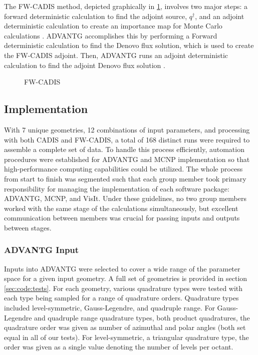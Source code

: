 \documentclass[10pt]{article}
\begin{document}
The FW-CADIS method, depicted graphically in \cref{flow:fw-cadis}, involves two major steps: a forward deterministic calculation to find the adjoint source, $q^\dagger$, and an adjoint deterministic calculation to create an importance map for Monte Carlo calculations \cite{slaybaugh:deterministic-parameter-study}.
ADVANTG accomplishes this by performing a Forward deterministic calculation to find the Denovo flux solution, which is used to create the FW-CADIS adjoint.
Then, ADVANTG runs an adjoint deterministic calculation to find the adjoint Denovo flux solution \cite{software:advantg}.


\begin{figure}[!t]

\caption{FW-CADIS}
\label{flow:fw-cadis}
\end{figure}

\subsection{Implementation}

With 7 unique geometries, 12 combinations of input parameters, and processing with both CADIS and FW-CADIS, a total of 168 distinct runs were required to assemble a complete set of data. To handle this process efficiently, automation procedures were established for ADVANTG and MCNP implementation so that high-performance computing capabilities could be utilized. 
The whole process from start to finish was segmented such that each group member took primary responsibility for managing the implementation of each software package: ADVANTG, MCNP, and VisIt. Under these guidelines, no two group members worked with the same stage of the calculations simultaneously, but excellent communication between members was crucial for passing inputs and outputs between stages.


\subsubsection{ADVANTG Input}
\label{sec:alg:advantg-in}

Inputs into ADVANTG were selected to cover a wide range of the parameter space for a given input geometry. A full set of geometries is provided in section \ref{sec:code:tests}. For each geometry, various quadrature types were tested with each type being sampled for a range of quadrature orders. Quadrature types included level-symmetric, Gauss-Legendre, and quadruple range. For Gauss-Legendre and quadruple range quadrature types, both product quadratures, the quadrature order was given as number of azimuthal and polar angles (both set equal in all of our tests). For level-symmetric, a triangular quadrature type, the order was given as a single value denoting the number of levels per octant.
\end{document}

